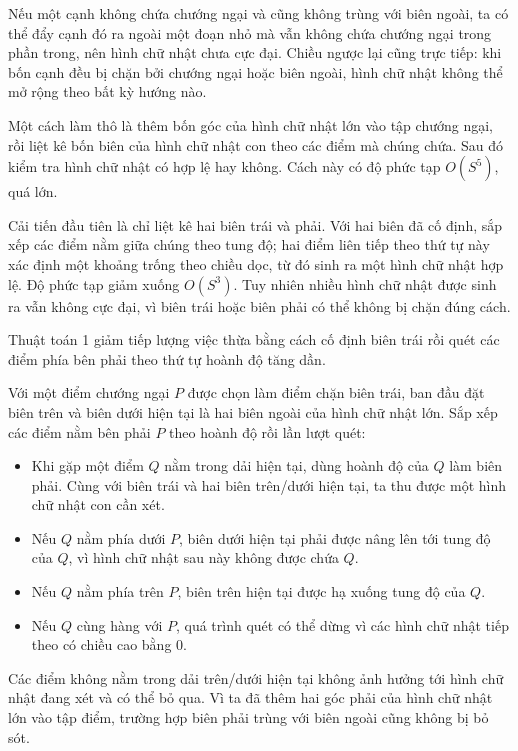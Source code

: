 \documentclass[11pt]{article}
\begin{document}
Nếu một cạnh không chứa chướng ngại và cũng không trùng với biên ngoài, ta có
thể đẩy cạnh đó ra ngoài một đoạn nhỏ mà vẫn không chứa chướng ngại trong
phần trong, nên hình chữ nhật chưa cực đại. Chiều ngược lại cũng trực tiếp:
khi bốn cạnh đều bị chặn bởi chướng ngại hoặc biên ngoài, hình chữ nhật không
thể mở rộng theo bất kỳ hướng nào.

Một cách làm thô là thêm bốn góc của hình chữ nhật lớn vào tập chướng ngại,
rồi liệt kê bốn biên của hình chữ nhật con theo các điểm mà chúng chứa. Sau
đó kiểm tra hình chữ nhật có hợp lệ hay không. Cách này có độ phức tạp
\(O(S^5)\), quá lớn.

Cải tiến đầu tiên là chỉ liệt kê hai biên trái và phải. Với hai biên đã cố
định, sắp xếp các điểm nằm giữa chúng theo tung độ; hai điểm liên tiếp theo
thứ tự này xác định một khoảng trống theo chiều dọc, từ đó sinh ra một hình
chữ nhật hợp lệ. Độ phức tạp giảm xuống \(O(S^3)\). Tuy nhiên nhiều hình chữ
nhật được sinh ra vẫn không cực đại, vì biên trái hoặc biên phải có thể không
bị chặn đúng cách.

Thuật toán 1 giảm tiếp lượng việc thừa bằng cách cố định biên trái rồi quét
các điểm phía bên phải theo thứ tự hoành độ tăng dần.

Với một điểm chướng ngại \(P\) được chọn làm điểm chặn biên trái, ban đầu đặt
biên trên và biên dưới hiện tại là hai biên ngoài của hình chữ nhật lớn. Sắp
xếp các điểm nằm bên phải \(P\) theo hoành độ rồi lần lượt quét:

\begin{itemize}
  \item Khi gặp một điểm \(Q\) nằm trong dải hiện tại, dùng hoành độ của \(Q\)
  làm biên phải. Cùng với biên trái và hai biên trên/dưới hiện tại, ta thu
  được một hình chữ nhật con cần xét.
  \item Nếu \(Q\) nằm phía dưới \(P\), biên dưới hiện tại phải được nâng lên
  tới tung độ của \(Q\), vì hình chữ nhật sau này không được chứa \(Q\).
  \item Nếu \(Q\) nằm phía trên \(P\), biên trên hiện tại được hạ xuống tung
  độ của \(Q\).
  \item Nếu \(Q\) cùng hàng với \(P\), quá trình quét có thể dừng vì các hình
  chữ nhật tiếp theo có chiều cao bằng \(0\).
\end{itemize}

Các điểm không nằm trong dải trên/dưới hiện tại không ảnh hưởng tới hình chữ
nhật đang xét và có thể bỏ qua. Vì ta đã thêm hai góc phải của hình chữ nhật
lớn vào tập điểm, trường hợp biên phải trùng với biên ngoài cũng không bị bỏ
sót.
\end{document}
